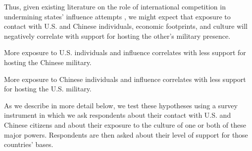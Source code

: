 Thus, given existing literature on the role of international competition in undermining states' influence attempts \cite{joyce2023}, we might expect that exposure to contact with U.S. and Chinese individuals, economic footprints, and culture will negatively correlate with support for hosting the other's military presence.

\begin{subhyp}
	
	\begin{hyp}
		More exposure to U.S. individuals and influence correlates with less support for hosting the Chinese military.
	\end{hyp}
	
	\begin{hyp}
		More exposure to Chinese individuals and influence correlates with less support for hosting the U.S. military.
	\end{hyp}
	
\end{subhyp}


As we describe in more detail below, we test these hypotheses using a survey instrument in which we ask respondents about their contact with U.S. and Chinese citizens and about their exposure to the culture of one or both of these major powers. Respondents are then asked about their level of support for those countries' bases.







